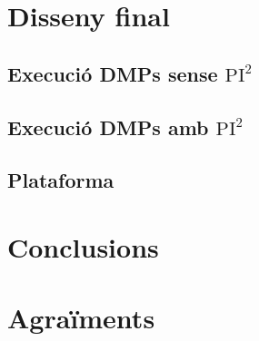 \documentclass[12pt,a4paper,final,twoside]{article}
\begin{document}
\newpage
\section{Disseny final}


\subsection{Execució DMPs sense $\mathrm{PI^2}$}
\subsection{Execució DMPs amb $\mathrm{PI^2}$}
\subsection{Plataforma}

\newpage
\section{Conclusions}

\newpage
\section*{Agraïments}

\newpage
\end{document}
